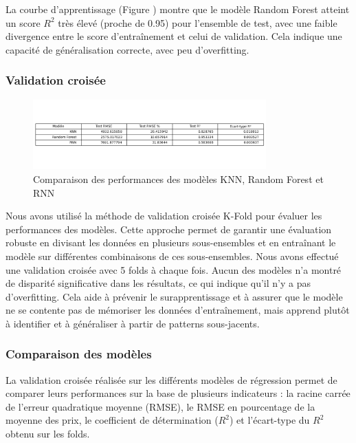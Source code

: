 \documentclass[12pt]{report}
\begin{document}
La courbe d'apprentissage (Figure \thefigure) montre que le modèle Random Forest atteint un score $R^2$ très élevé (proche de 0.95) pour l'ensemble de test, avec une faible divergence entre le score d'entraînement et celui de validation. Cela indique une capacité de généralisation correcte, avec peu d'overfitting.

\subsubsection{Validation croisée}

\begin{figure}[H]
    \centering
    \includegraphics[width=0.8\textwidth]{metrics_comparison_final.png}
    \caption{Comparaison des performances des modèles KNN, Random Forest et RNN}
\end{figure}


Nous avons utilisé la méthode de validation croisée K-Fold pour évaluer les performances des modèles. Cette approche permet de garantir une évaluation robuste en divisant les données en plusieurs sous-ensembles et en entraînant le modèle sur différentes combinaisons de ces sous-ensembles. Nous avons effectué une validation croisée avec 5 folds à chaque fois. Aucun des modèles n'a montré de disparité significative dans les résultats, ce qui indique qu'il n'y a pas d'overfitting. Cela aide à prévenir le surapprentissage et à assurer que le modèle ne
se contente pas de mémoriser les données d'entraînement, mais apprend plutôt à identifier
et à généraliser à partir de patterns sous-jacents.

\subsubsection{Comparaison des modèles}

La validation croisée réalisée sur les différents modèles de régression permet de comparer leurs performances sur la base de plusieurs indicateurs : la racine carrée de l'erreur quadratique moyenne (RMSE), le RMSE en pourcentage de la moyenne des prix, le coefficient de détermination ($R^2$) et l'écart-type du $R^2$ obtenu sur les folds.
\end{document}
